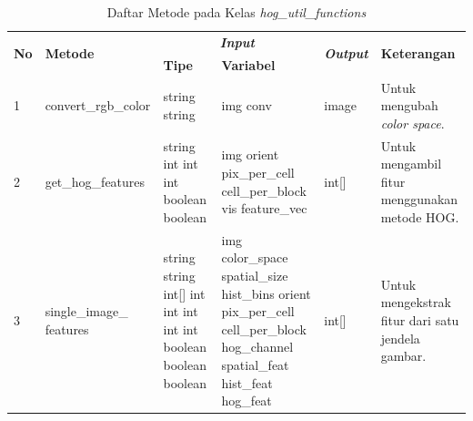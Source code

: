 \begin{small}
	\begin{longtable}{|p{0.4cm}|p{2.6cm}|p{2cm}|p{2.5cm}|p{1.5cm}|p{4.5cm}|}
		\caption{Daftar Metode pada Kelas \textit{hog\_util\_functions}} \\	
		\hline
		\multirow{2}{*}{\textbf{No}} & \multirow{2}{*}{\textbf{Metode}} & \multicolumn{2}{c|}{\textit{\textbf{Input}}} & \multirow{2}{*}{\textit{\textbf{Output}}} & 
		\multirow{2}{*}{\textbf{Keterangan}}\\
		\cline{3-4}
		& & \textbf{Tipe} & \textbf{Variabel} & & \\
		\hline
		1 & convert\_rgb\_color & string \newline string & img \newline conv & image & Untuk mengubah \textit{color space}.\\
		\hline
		2 & get\_hog\_features & string \newline int \newline int \newline int \newline boolean \newline boolean & img \newline orient \newline pix\_per\_cell \newline cell\_per\_block \newline vis \newline feature\_vec & int[] & Untuk mengambil fitur menggunakan metode HOG.\\
		\hline
		3 & single\_image\_ \newline features & string \newline string \newline int[] \newline int \newline int \newline int \newline int \newline int \newline boolean \newline boolean \newline boolean & img \newline color\_space \newline spatial\_size \newline hist\_bins \newline orient \newline pix\_per\_cell \newline cell\_per\_block \newline hog\_channel \newline spatial\_feat \newline hist\_feat \newline hog\_feat & int[] & Untuk mengekstrak fitur dari satu jendela gambar.\\
		\hline
	\end{longtable}
\end{small}

